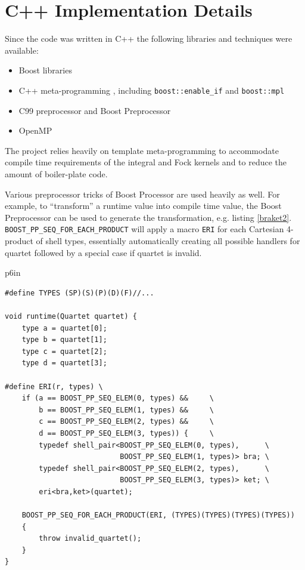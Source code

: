 \documentclass[12pt]{article}
\begin{document}
\section*{C++ Implementation Details}
Since the code was written in C++ the following  libraries and
techniques were available:

\begin{itemize}
\item Boost libraries \cite{boost}
 \item {C++ meta-programming \cite{abrahams_c_2005}, including
   {\tt boost::enable\_if} \cite{boost:enable_if} and
   {\tt boost::mpl} \cite{boost:mpl}
 }
\item C99 preprocessor and Boost Preprocessor \cite{boost:pp}
\item OpenMP \cite{boost:thread}
\end{itemize}

The project relies heavily on template meta-programming
to accommodate compile time requirements of the integral and  Fock
kernels and to reduce the amount of boiler-plate code.

Various preprocessor tricks of Boost Processor are used heavily as
well.  For example, to ``transform'' a runtime value into compile time
value, the Boost Preprocessor can be used to generate the
transformation, e.g. listing \ref{braket2}.  {\tt
  BOOST\_PP\_SEQ\_FOR\_EACH\_PRODUCT} will apply a macro {\tt ERI} for
each Cartesian 4-product of shell types, essentially automatically
creating all possible handlers for quartet followed by a special case
if quartet is invalid.

\begin{table}
\begin{tabular}{ p{6in} }
\hline
\begin{verbatim}
#define TYPES (SP)(S)(P)(D)(F)//...

void runtime(Quartet quartet) {
    type a = quartet[0];
    type b = quartet[1];
    type c = quartet[2];
    type d = quartet[3];

#define ERI(r, types) \
    if (a == BOOST_PP_SEQ_ELEM(0, types) &&		\
        b == BOOST_PP_SEQ_ELEM(1, types) &&		\
        c == BOOST_PP_SEQ_ELEM(2, types) &&		\
        d == BOOST_PP_SEQ_ELEM(3, types)) {		\
        typedef shell_pair<BOOST_PP_SEQ_ELEM(0, types),      \
                           BOOST_PP_SEQ_ELEM(1, types)> bra; \
        typedef shell_pair<BOOST_PP_SEQ_ELEM(2, types),      \
                           BOOST_PP_SEQ_ELEM(3, types)> ket; \
        eri<bra,ket>(quartet);

    BOOST_PP_SEQ_FOR_EACH_PRODUCT(ERI, (TYPES)(TYPES)(TYPES)(TYPES))
    {
        throw invalid_quartet();
    }
}
\end{verbatim} \\
\hline

\label{braket2}
\caption{Using preprocessor}
\end{tabular}
\end{table}
\end{document}
